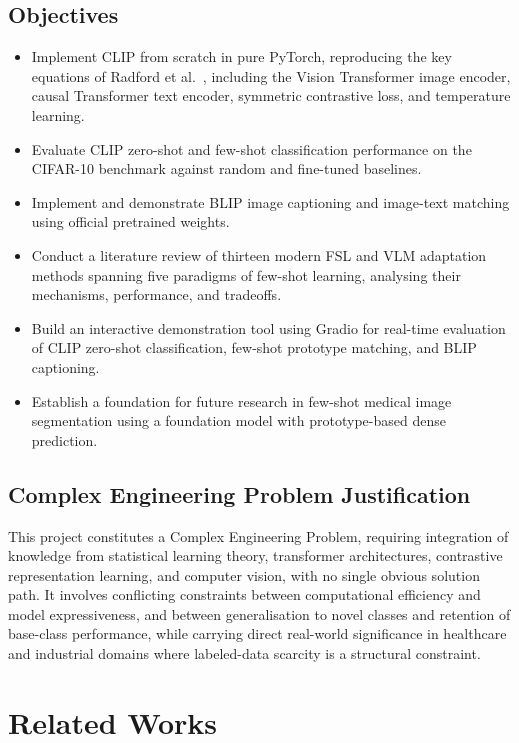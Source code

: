 \documentclass{iutbscthesis}
\begin{document}
\section{Objectives}

\begin{itemize}
    \item Implement CLIP from scratch in pure PyTorch, reproducing the key equations of Radford et al.\ \cite{radford2021clip}, including the Vision Transformer image encoder, causal Transformer text encoder, symmetric contrastive loss, and temperature learning.
    \item Evaluate CLIP zero-shot and few-shot classification performance on the CIFAR-10 benchmark against random and fine-tuned baselines.
    \item Implement and demonstrate BLIP image captioning and image-text matching using official pretrained weights.
    \item Conduct a literature review of thirteen modern FSL and VLM adaptation methods spanning five paradigms of few-shot learning, analysing their mechanisms, performance, and tradeoffs.
    \item Build an interactive demonstration tool using Gradio for real-time evaluation of CLIP zero-shot classification, few-shot prototype matching, and BLIP captioning.
    \item Establish a foundation for future research in few-shot medical image segmentation using a foundation model with prototype-based dense prediction.
\end{itemize}

\section{Complex Engineering Problem Justification}

This project constitutes a Complex Engineering Problem, requiring integration of knowledge from statistical learning theory, transformer architectures, contrastive representation learning, and computer vision, with no single obvious solution path. It involves conflicting constraints between computational efficiency and model expressiveness, and between generalisation to novel classes and retention of base-class performance, while carrying direct real-world significance in healthcare and industrial domains where labeled-data scarcity is a structural constraint.

\chapter{Related Works}
\end{document}
